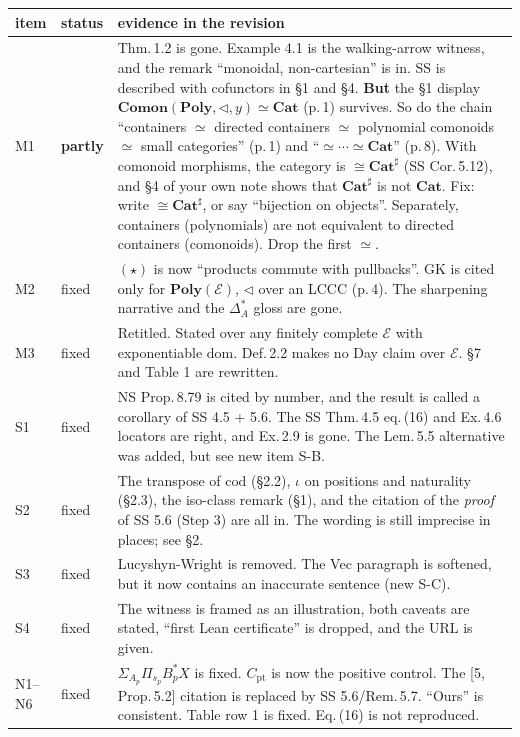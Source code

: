 \documentclass[10pt]{amsart}
\newcommand{\tri}{\mathbin{\triangleleft}}
\newcommand{\Poly}{\mathbf{Poly}}
\newcommand{\Cat}{\mathbf{Cat}}
\newcommand{\Comon}{\mathbf{Comon}}
\newcommand{\E}{\mathcal{E}}
\newcommand{\ok}{\textsf{fixed}}
\begin{document}
\begin{center}\small
\begin{longtable}{@{}l l p{}@{}}
\toprule
item & status & evidence in the revision\\ \midrule
M1 & \textbf{partly} & Thm.\,1.2 is gone. Example 4.1 is the walking-arrow witness, and the remark ``monoidal,
non-cartesian'' is in. SS is described with cofunctors in \S1 and \S4. \textbf{But} the \S1 display
$\Comon(\Poly,\tri,y)\simeq\Cat$ (p.\,1) survives. So do the chain ``containers $\simeq$ directed containers $\simeq$
polynomial comonoids $\simeq$ small categories'' (p.\,1) and ``$\simeq\cdots\simeq\Cat$'' (p.\,8). With comonoid
morphisms, the category is $\cong\Cat^\sharp$ (SS Cor.\,5.12), and \S4 of your own note shows that $\Cat^\sharp$ is
not $\Cat$. Fix: write $\cong\Cat^\sharp$, or say ``bijection on objects''. Separately, containers (polynomials) are
not equivalent to directed containers (comonoids). Drop the first $\simeq$.\\
M2 & \ok & $(\star)$ is now ``products commute with pullbacks''. GK is cited only for $\Poly(\E)$, $\tri$ over an
LCCC (p.\,4). The sharpening narrative and the $\Delta_A^*$ gloss are gone.\\
M3 & \ok & Retitled. Stated over any finitely complete $\E$ with exponentiable $\mathrm{dom}$. Def.\,2.2 makes no Day
claim over $\E$. \S7 and Table 1 are rewritten.\\
S1 & \ok & NS Prop.\,8.79 is cited by number, and the result is called a corollary of SS 4.5 + 5.6. The SS
Thm.\,4.5 eq.\,(16) and Ex.\,4.6 locators are right, and Ex.\,2.9 is gone. The Lem.\,5.5 alternative was added, but
see new item S-B.\\
S2 & \ok & The transpose of $\mathrm{cod}$ (\S2.2), $\iota$ on positions and naturality (\S2.3), the iso-class
remark (\S1), and the citation of the \emph{proof} of SS 5.6 (Step 3) are all in. The wording is still imprecise in
places; see \S2.\\
S3 & \ok & Lucyshyn-Wright is removed. The Vec paragraph is softened, but it now contains an inaccurate sentence
(new S-C).\\
S4 & \ok & The witness is framed as an illustration, both caveats are stated, ``first Lean certificate'' is dropped,
and the URL is given.\\
N1--N6 & \ok & $\Sigma_{A_p}\Pi_{s_p}B_p^*X$ is fixed. $C_{\mathrm{pt}}$ is now the positive control. The [5,
Prop.\,5.2] citation is replaced by SS 5.6/Rem.\,5.7. ``Ours'' is consistent. Table row 1 is fixed. Eq.\,(16) is not
reproduced.\\
\bottomrule
\end{longtable}
\end{center}
\end{document}
